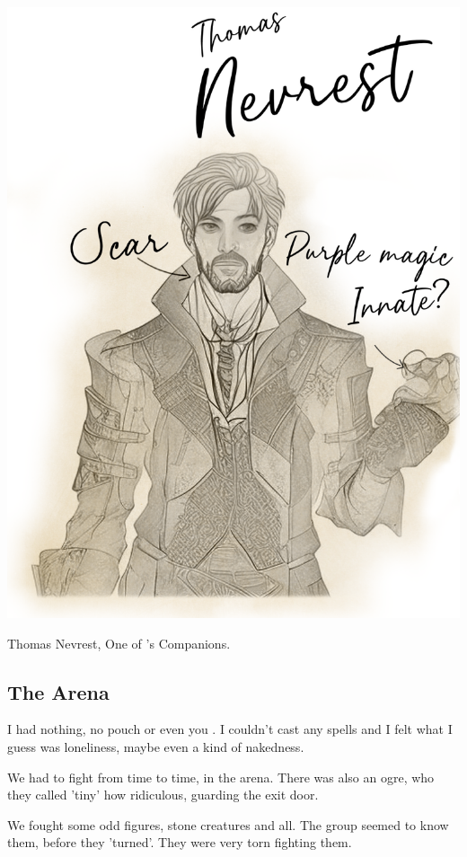 \vfill
\includegraphics[width=\linewidth-2ex]{images/Nevrest.png}
\begin{DndReadAloud}
    Thomas Nevrest, One of \Name{}'s Companions.
\end{DndReadAloud}
\vfill

\subsection*{The Arena}
I had nothing, no pouch or even you \Master{}. I couldn't cast any spells and I felt what I guess was loneliness, maybe even a kind of nakedness.

We had to fight from time to time, in the arena. There was also an ogre, who they called 'tiny' how ridiculous, guarding the exit door.

We fought some odd figures, stone creatures and all. The group seemed to know them, before they 'turned'. They were very torn fighting them.

